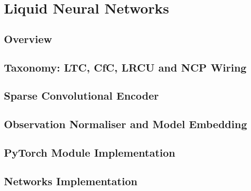 \chapter{Liquid Neural Networks}
\label{ch:lnn}

\section{Overview}

\section{Taxonomy: LTC, CfC, LRCU and NCP Wiring}
\label{sec:lnn-taxonomy}

\section{Sparse Convolutional Encoder}
\label{sec:sparse-encoder}

\section{Observation Normaliser and Model Embedding}
\label{sec:aux-modules}

\section{PyTorch Module Implementation}

\section{Networks Implementation}
\label{sec:networks-implementation}
